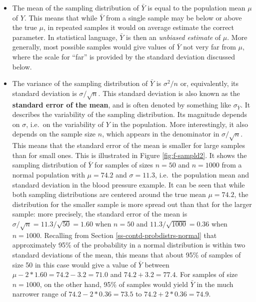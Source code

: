 \documentclass[11pt,a4paper,openany]{book}
\begin{document}
\begin{itemize}
\item
  The mean of the sampling distribution of \(\bar{Y}\) is equal to the
  population mean \(\mu\) of \(Y\). This means that while \(\bar{Y}\)
  from a single sample may be below or above the true \(\mu\), in
  repeated samples it would on average estimate the correct parameter.
  In statistical language, \(\bar{Y}\) is then an \emph{unbiased
  estimate} of \(\mu\). More generally, most possible samples would give
  values of \(\bar{Y}\) not very far from \(\mu\), where the scale for
  ``far'' is provided by the standard deviation discussed below.
\item
  The variance of the sampling distribution of \(\bar{Y}\) is
  \(\sigma^{2}/n\) or, equivalently, its standard deviation is
  \(\sigma/\sqrt{n}\). This standard deviation is also known as the
  \textbf{standard error of the mean}, and is often denoted by something
  like \(\sigma_{\bar{Y}}\). It describes the variability of the
  sampling distribution. Its magnitude depends on \(\sigma\), i.e.~on
  the variability of \(Y\) in the population. More interestingly, it
  also depends on the sample size \(n\), which appears in the
  denominator in \(\sigma/\sqrt{n}\). This means that the standard error
  of the mean is smaller for large samples than for small ones. This is
  illustrated in Figure \ref{fig:f-sampld2}. It shows the sampling
  distribution of \(\bar{Y}\) for samples of sizes \(n=50\) and
  \(n=1000\) from a normal population with \(\mu=74.2\) and
  \(\sigma=11.3\), i.e.~the population mean and standard deviation in
  the blood pressure example. It can be seen that while both sampling
  distributions are centered around the true mean \(\mu=74.2\), the
  distribution for the smaller sample is more spread out than that for
  the larger sample: more precisely, the standard error of the mean is
  \(\sigma/\sqrt{n}=11.3/\sqrt{50}=1.60\) when \(n=50\) and
  \(11.3/\sqrt{1000}=0.36\) when \(n=1000\). Recalling from Section
  \ref{ss-contd-probdistrs-normal} that approximately 95\% of the
  probability in a normal distribution is within two standard deviations
  of the mean, this means that about 95\% of samples of size 50 in this
  case would give a value of \(\bar{Y}\) between
  \(\mu-2*1.60=74.2-3.2=71.0\) and \(74.2+3.2=77.4\). For samples of
  size \(n=1000\), on the other hand, 95\% of samples would yield
  \(\bar{Y}\) in the much narrower range of \(74.2-2*0.36=73.5\) to
  \(74.2+2*0.36=74.9\).
\end{itemize}
\end{document}
